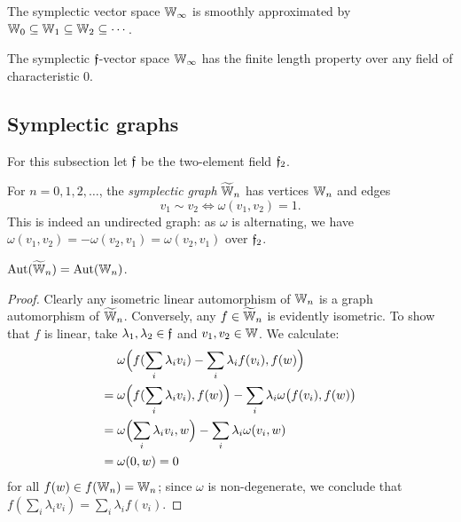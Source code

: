 \begin{theorem}\label{thm:symplectic-smooth-approximation}
    The symplectic vector space $\mathbb{W}_\infty$ is smoothly approximated by 
    $\mathbb{W}_0 \subseteq \mathbb{W}_1 \subseteq \mathbb{W}_2 \subseteq \cdots$.
\end{theorem}

\begin{corollary}
    The symplectic $\mathfrak{f}$-vector space $\mathbb{W}_\infty$ has the finite length property over any field of characteristic $0$.
\end{corollary}




\subsection{Symplectic graphs}
For this subsection let $\mathfrak{f}$ be the two-element field $\mathfrak{f}_2$.
\begin{definition}
    For $n = 0, 1, 2, \ldots$, the \emph{symplectic graph} $\widetilde {\mathbb{W}}_n$ has vertices $\mathbb{W}_n$ and edges
    \[
        v_1 \sim v_2 \iff \omega(v_1, v_2) = 1.
    \]
    This is indeed an undirected graph: as $\omega$ is alternating, we have $\omega(v_1, v_2) = -\omega(v_2, v_1) = \omega(v_2, v_1)$ over $\mathfrak{f}_2$.
\end{definition}

\begin{proposition}\label{prop:symplectic-vs-graph}
    $\operatorname{Aut}(\widetilde {\mathbb{W}}_n) = \operatorname{Aut}(\mathbb{W}_n)$.
\end{proposition}
\begin{proof}
    Clearly any isometric linear automorphism of $\mathbb{W}_n$ is a graph automorphism of $\widetilde {\mathbb{W}}_n$.
    Conversely, any $f \in \widetilde {\mathbb{W}}_n$ is evidently isometric.
    To show that $f$ is linear, take $\lambda_1, \lambda_2 \in \mathfrak{f}$ and $v_1, v_2 \in \mathbb{W}$.
    We calculate:
    \begin{align*}
        &\omega\Bigl( f(\sum_i \lambda_i v_i) - \sum_i \lambda_i f(v_i) , f(w) \Bigr) \\
        ={}& \omega\Bigl( f(\sum_i \lambda_i v_i), f(w)\Bigr) - \sum_i \lambda_i \omega\bigl(f(v_i), f(w) \bigr) \\
        ={}& \omega\Bigl( \sum_i \lambda_i v_i, w \Bigr) - \sum_i \lambda_i \omega( v_i, w ) \\
        ={}& \omega(0, w) = 0
    \end{align*}
    for all $f(w) \in f(\mathbb{W}_n) = \mathbb{W}_n$;
    since $\omega$ is non-degenerate, 
    we conclude that $f(\sum_i \lambda_i v_i) = \sum_i \lambda_i f(v_i)$.
\end{proof}

